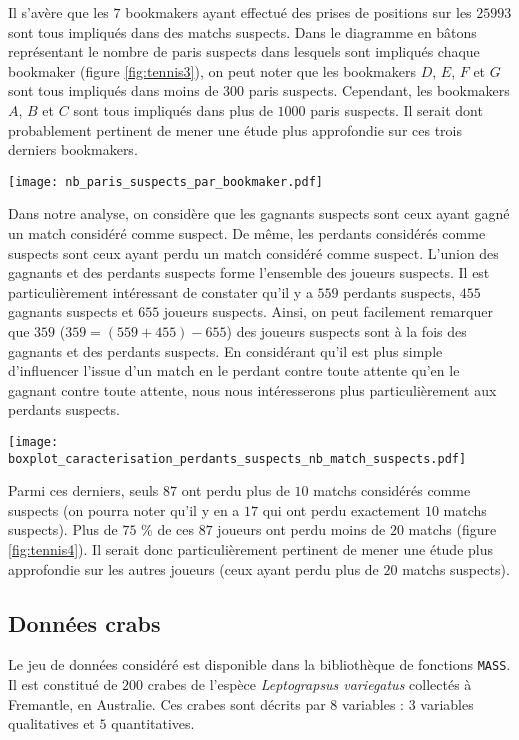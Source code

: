 \documentclass{article}
\begin{document}
\begin{multicols}{2}
Il s'avère que les $7$ bookmakers ayant effectué des prises de positions sur les $25993$ sont tous impliqués dans des matchs suspects. Dans le diagramme en bâtons représentant le nombre de paris suspects dans lesquels sont impliqués chaque bookmaker (figure \ref{fig:tennis3}), on peut noter que les bookmakers $D$, $E$, $F$ et $G$ sont tous impliqués dans moins de $300$ paris suspects. Cependant, les bookmakers $A$, $B$ et $C$ sont tous impliqués dans plus de $1000$ paris suspects. Il serait dont probablement pertinent de mener une étude plus approfondie sur ces trois derniers bookmakers. 

\begingroup
    \centering
   \texttt{[image: nb\_paris\_suspects\_par\_bookmaker.pdf]}
    \label{fig:tennis3}
\endgroup

Dans notre analyse, on considère que les gagnants suspects sont ceux ayant gagné un match considéré comme suspect. De même, les perdants considérés comme suspects sont ceux ayant perdu un match considéré comme suspect. L'union des gagnants et des perdants suspects forme l'ensemble des joueurs suspects. Il est particulièrement intéressant de constater qu'il y a $559$ perdants suspects, $455$ gagnants suspects et $655$ joueurs suspects. Ainsi, on peut facilement remarquer que $359$ ($359 = (559 + 455) -655 $) des joueurs suspects sont à la fois des gagnants et des perdants suspects. En considérant qu'il est plus simple d'influencer l'issue d'un match en le perdant contre toute attente qu'en le gagnant contre toute attente, nous nous intéresserons plus particulièrement aux perdants suspects. 

\begingroup
    \centering
   \texttt{[image: boxplot\_caracterisation\_perdants\_suspects\_nb\_match\_suspects.pdf]}
    \label{fig:tennis4}
\endgroup

Parmi ces derniers, seuls $87$ ont perdu plus de $10$ matchs considérés comme suspects (on pourra noter qu'il y en a $17$ qui ont perdu exactement $10$ matchs suspects). Plus de $75$ \% de ces $87$ joueurs ont perdu moins de $20$ matchs (figure \ref{fig:tennis4}). Il serait donc particulièrement pertinent de mener une étude plus approfondie sur les autres joueurs (ceux ayant perdu plus de $20$ matchs suspects). 

\subsection{Données crabs}
\label{sub_sec_donnees_crabs}
Le jeu de données considéré est disponible dans la bibliothèque de fonctions \texttt{MASS}. Il est constitué de $200$ crabes de l'espèce \textit{Leptograpsus variegatus} collectés à Fremantle, en Australie. Ces crabes sont décrits par $8$ variables : $3$ variables qualitatives et $5$ quantitatives.


\end{multicols}
\end{document}
